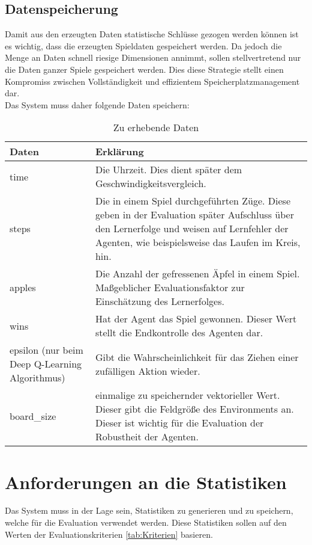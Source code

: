 \subsection{Datenspeicherung}
Damit aus den erzeugten Daten statistische Schlüsse gezogen werden können ist es wichtig, dass die erzeugten Spieldaten gespeichert werden. Da jedoch die Menge an Daten schnell riesige Dimensionen annimmt, sollen stellvertretend nur die Daten ganzer Spiele gespeichert werden. Dies diese Strategie stellt einen Kompromiss zwischen Vollständigkeit und effizientem Speicherplatzmanagement dar.\\
Das System muss daher folgende Daten speichern:
\begin{longtable}[h]{|p{4cm}|p{\linewidth - 5cm}|}
	\caption{Zu erhebende Daten}
	\label{tab:Datenerhebung} 
	\endfirsthead
	\endhead
	\hline
	Daten & Erklärung \\
	\hline
	time & Die Uhrzeit. Dies dient später dem Geschwindigkeitsvergleich. \\
	\hline
	steps & Die in einem Spiel durchgeführten Züge. Diese geben in der Evaluation später Aufschluss über den Lernerfolge und weisen auf Lernfehler der Agenten, wie beispielsweise das Laufen im Kreis, hin. \\
	\hline
	apples & Die Anzahl der gefressenen Äpfel in einem Spiel. Maßgeblicher Evaluationsfaktor zur Einschätzung des Lernerfolges. \\
	\hline
	wins & Hat der Agent das Spiel gewonnen. Dieser Wert stellt die Endkontrolle des Agenten dar. \\
	\hline
	epsilon (nur beim Deep Q-Learning Algorithmus) & Gibt die Wahrscheinlichkeit für das Ziehen einer zufälligen Aktion wieder. \\
	\hline
	board\_size &  einmalige zu speichernder vektorieller Wert. Dieser gibt die Feldgröße des Environments an. Dieser ist wichtig für die Evaluation der Robustheit der Agenten. \\
	\hline
\end{longtable}

\section{Anforderungen an die Statistiken}
Das System muss in der Lage sein, Statistiken zu generieren und zu speichern, welche für die Evaluation verwendet werden. Diese Statistiken sollen auf den Werten der Evaluationskriterien \ref{tab:Kriterien} basieren.

